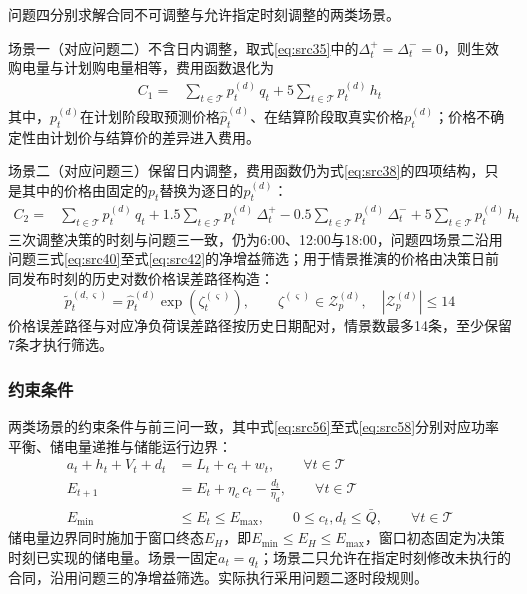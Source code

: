 问题四分别求解合同不可调整与允许指定时刻调整的两类场景。

场景一（对应问题二）不含日内调整，取式\eqref{eq:src35}中的$\Delta_t^{+}=\Delta_t^{-}=0$，则生效购电量与计划购电量相等，费用函数退化为
\begin{equation}\label{eq:src53}
    \begin{aligned}
    C_{1}={}&\sum_{t\in\mathcal{T}}p_{t}^{(d)}\,q_{t}+5\sum_{t\in\mathcal{T}}p_{t}^{(d)}\,h_{t}
    \end{aligned}
\end{equation}
其中，$p_t^{(d)}$在计划阶段取预测价格$\hat{p}_t^{(d)}$、在结算阶段取真实价格$p_t^{(d)}$；价格不确定性由计划价与结算价的差异进入费用。

场景二（对应问题三）保留日内调整，费用函数仍为式\eqref{eq:src38}的四项结构，只是其中的价格由固定的$p_t$替换为逐日的$p_t^{(d)}$：
\begin{equation}\label{eq:src54}
    \begin{aligned}
    C_{2}={}&\sum_{t\in\mathcal{T}}p_{t}^{(d)}\,q_{t}
    +1.5\sum_{t\in\mathcal{T}}p_{t}^{(d)}\,\Delta_{t}^{+}
    -0.5\sum_{t\in\mathcal{T}}p_{t}^{(d)}\,\Delta_{t}^{-}
    +5\sum_{t\in\mathcal{T}}p_{t}^{(d)}\,h_{t}
    \end{aligned}
\end{equation}
三次调整决策的时刻与问题三一致，仍为6:00、12:00与18:00，问题四场景二沿用问题三式\eqref{eq:src40}至式\eqref{eq:src42}的净增益筛选；用于情景推演的价格由决策日前同发布时刻的历史对数价格误差路径构造：
\begin{equation}\label{eq:src55}
    \tilde{p}_{t}^{(d,\varsigma)}=\hat{p}_{t}^{(d)}\exp\left(\zeta_{t}^{(\varsigma)}\right),\qquad \zeta^{(\varsigma)}\in\mathcal{Z}_{p}^{(d)},\quad |\mathcal{Z}_{p}^{(d)}|\le14
\end{equation}
价格误差路径与对应净负荷误差路径按历史日期配对，情景数最多14条，至少保留7条才执行筛选。

\subsubsection{约束条件}

两类场景的约束条件与前三问一致，其中式\eqref{eq:src56}至式\eqref{eq:src58}分别对应功率平衡、储电量递推与储能运行边界：
\begin{align}
    a_{t}+h_{t}+V_{t}+d_{t}&=L_{t}+c_{t}+w_{t},\qquad \forall t\in\mathcal{T}\label{eq:src56}\\
    E_{t+1}&=E_{t}+\eta_{c}\,c_{t}-\frac{d_{t}}{\eta_{d}},\qquad \forall t\in\mathcal{T}\label{eq:src57}\\
    E_{\min}&\le E_{t}\le E_{\max},\qquad 0\le c_{t},d_{t}\le \bar{Q},\qquad \forall t\in\mathcal{T}
\label{eq:src58}\end{align}
储电量边界同时施加于窗口终态$E_H$，即$E_{\min}\le E_H\le E_{\max}$，窗口初态固定为决策时刻已实现的储电量。场景一固定$a_t=q_t$；场景二只允许在指定时刻修改未执行的合同，沿用问题三的净增益筛选。实际执行采用问题二逐时段规则。


